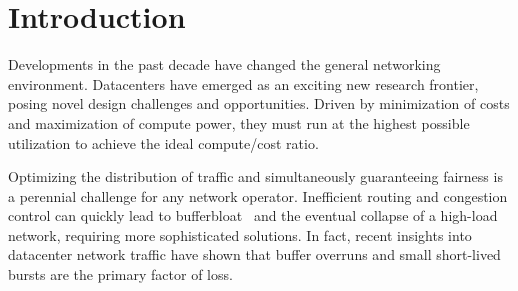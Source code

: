 
\section{Introduction}
\label{sec:intro}

%
%

Developments in the past decade have changed the general networking 
environment. Datacenters have emerged as an exciting new research frontier, 
posing novel design challenges and opportunities. Driven by minimization of 
costs and maximization of compute power, they must run at the highest 
possible utilization to achieve the ideal compute/cost ratio.

Optimizing the distribution of traffic and simultaneously guaranteeing fairness is a perennial challenge for any network operator.
Inefficient routing and congestion control can quickly lead to 
bufferbloat~\cite{bufferbloat} and the eventual collapse of a high-load 
network, requiring more sophisticated solutions. In fact, recent insights into 
datacenter network traffic have shown that buffer overruns and small 
short-lived bursts are the primary factor of loss.\cite{fb_dc,msr_dc,dctcp}

